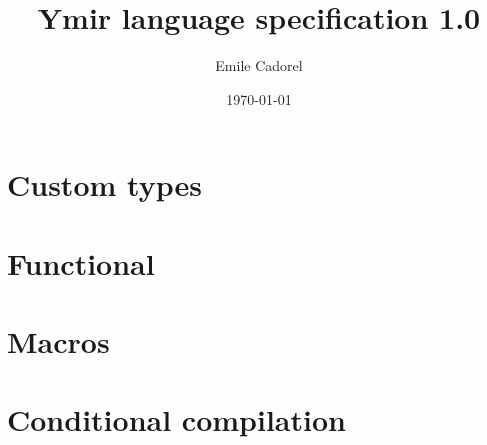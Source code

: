 \documentclass[twoside,a4paper,11pt]{book}
\author{Emile Cadorel}
\date{\today}
\title{Ymir language specification 1.0}
\begin{document}
\setlength{\aweboxleftmargin}{0.05\linewidth}
\setlength{\aweboxcontentwidth}{0.93\linewidth}


\maketitle
\dominitoc
\dominilof
\dominilot



\begin{multicols*}{2}
  \tableofcontents
\end{multicols*}








\chapter{Custom types}%
\label{chap:custom_types}

\begin{multicols*}{2}
  \minitoc%
  
\end{multicols*}

\chapter{Functional}
\label{chap:functional}

\begin{multicols*}{2}
  \minitoc%
  
\end{multicols*}

\chapter{Macros}
\label{chap:macros}

\begin{multicols*}{2}
  \minitoc%
\end{multicols*}


\chapter{Conditional compilation}
\label{chap:conditional_compilation}

\begin{multicols*}{2}
  \minitoc%
\end{multicols*}
\end{document}
